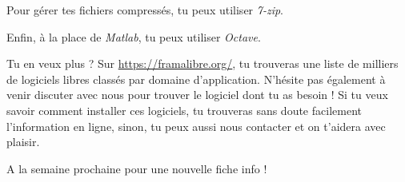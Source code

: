 \documentclass[11pt]{../fiche}
\begin{document}
Pour gérer tes fichiers compressés, tu peux utiliser \textit{7-zip}.

Enfin, à la place de \textit{Matlab}, tu peux utiliser \textit{Octave}.

\vspace*{0.5cm}Tu en veux plus ? Sur \url{https://framalibre.org/}, tu trouveras une liste
de milliers de logiciels libres classés par domaine d'application. N'hésite pas également à venir discuter avec nous pour trouver le logiciel dont tu as besoin ! Si tu veux savoir comment installer ces logiciels, tu trouveras sans doute facilement l'information en ligne, sinon, tu peux aussi nous contacter et on t'aidera avec plaisir.

A la semaine prochaine pour une nouvelle fiche info !
\end{document}
